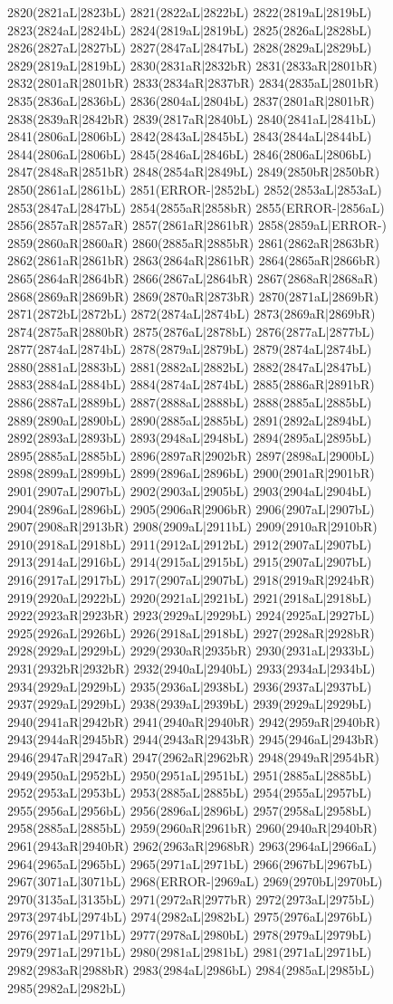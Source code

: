 2820(2821aL|2823bL) 2821(2822aL|2822bL) 2822(2819aL|2819bL) 2823(2824aL|2824bL) 2824(2819aL|2819bL) 2825(2826aL|2828bL) 2826(2827aL|2827bL) 2827(2847aL|2847bL) 2828(2829aL|2829bL) 2829(2819aL|2819bL) 2830(2831aR|2832bR) 2831(2833aR|2801bR) 2832(2801aR|2801bR) 2833(2834aR|2837bR) 2834(2835aL|2801bR) 2835(2836aL|2836bL) 2836(2804aL|2804bL) 2837(2801aR|2801bR) 2838(2839aR|2842bR) 2839(2817aR|2840bL) 2840(2841aL|2841bL) 2841(2806aL|2806bL) 2842(2843aL|2845bL) 2843(2844aL|2844bL) 2844(2806aL|2806bL) 2845(2846aL|2846bL) 2846(2806aL|2806bL) 2847(2848aR|2851bR) 2848(2854aR|2849bL) 2849(2850bR|2850bR) 2850(2861aL|2861bL) 2851(ERROR-|2852bL) 2852(2853aL|2853aL) 2853(2847aL|2847bL) 2854(2855aR|2858bR) 2855(ERROR-|2856aL) 2856(2857aR|2857aR) 2857(2861aR|2861bR) 2858(2859aL|ERROR-) 2859(2860aR|2860aR) 2860(2885aR|2885bR) 2861(2862aR|2863bR) 2862(2861aR|2861bR) 2863(2864aR|2861bR) 2864(2865aR|2866bR) 2865(2864aR|2864bR) 2866(2867aL|2864bR) 2867(2868aR|2868aR) 2868(2869aR|2869bR) 2869(2870aR|2873bR) 2870(2871aL|2869bR) 2871(2872bL|2872bL) 2872(2874aL|2874bL) 2873(2869aR|2869bR) 2874(2875aR|2880bR) 2875(2876aL|2878bL) 2876(2877aL|2877bL) 2877(2874aL|2874bL) 2878(2879aL|2879bL) 2879(2874aL|2874bL) 2880(2881aL|2883bL) 2881(2882aL|2882bL) 2882(2847aL|2847bL) 2883(2884aL|2884bL) 2884(2874aL|2874bL) 2885(2886aR|2891bR) 2886(2887aL|2889bL) 2887(2888aL|2888bL) 2888(2885aL|2885bL) 2889(2890aL|2890bL) 2890(2885aL|2885bL) 2891(2892aL|2894bL) 2892(2893aL|2893bL) 2893(2948aL|2948bL) 2894(2895aL|2895bL) 2895(2885aL|2885bL) 2896(2897aR|2902bR) 2897(2898aL|2900bL) 2898(2899aL|2899bL) 2899(2896aL|2896bL) 2900(2901aR|2901bR) 2901(2907aL|2907bL) 2902(2903aL|2905bL) 2903(2904aL|2904bL) 2904(2896aL|2896bL) 2905(2906aR|2906bR) 2906(2907aL|2907bL) 2907(2908aR|2913bR) 2908(2909aL|2911bL) 2909(2910aR|2910bR) 2910(2918aL|2918bL) 2911(2912aL|2912bL) 2912(2907aL|2907bL) 2913(2914aL|2916bL) 2914(2915aL|2915bL) 2915(2907aL|2907bL) 2916(2917aL|2917bL) 2917(2907aL|2907bL) 2918(2919aR|2924bR) 2919(2920aL|2922bL) 2920(2921aL|2921bL) 2921(2918aL|2918bL) 2922(2923aR|2923bR) 2923(2929aL|2929bL) 2924(2925aL|2927bL) 2925(2926aL|2926bL) 2926(2918aL|2918bL) 2927(2928aR|2928bR) 2928(2929aL|2929bL) 2929(2930aR|2935bR) 2930(2931aL|2933bL) 2931(2932bR|2932bR) 2932(2940aL|2940bL) 2933(2934aL|2934bL) 2934(2929aL|2929bL) 2935(2936aL|2938bL) 2936(2937aL|2937bL) 2937(2929aL|2929bL) 2938(2939aL|2939bL) 2939(2929aL|2929bL) 2940(2941aR|2942bR) 2941(2940aR|2940bR) 2942(2959aR|2940bR) 2943(2944aR|2945bR) 2944(2943aR|2943bR) 2945(2946aL|2943bR) 2946(2947aR|2947aR) 2947(2962aR|2962bR) 2948(2949aR|2954bR) 2949(2950aL|2952bL) 2950(2951aL|2951bL) 2951(2885aL|2885bL) 2952(2953aL|2953bL) 2953(2885aL|2885bL) 2954(2955aL|2957bL) 2955(2956aL|2956bL) 2956(2896aL|2896bL) 2957(2958aL|2958bL) 2958(2885aL|2885bL) 2959(2960aR|2961bR) 2960(2940aR|2940bR) 2961(2943aR|2940bR) 2962(2963aR|2968bR) 2963(2964aL|2966aL) 2964(2965aL|2965bL) 2965(2971aL|2971bL) 2966(2967bL|2967bL) 2967(3071aL|3071bL) 2968(ERROR-|2969aL) 2969(2970bL|2970bL) 2970(3135aL|3135bL) 2971(2972aR|2977bR) 2972(2973aL|2975bL) 2973(2974bL|2974bL) 2974(2982aL|2982bL) 2975(2976aL|2976bL) 2976(2971aL|2971bL) 2977(2978aL|2980bL) 2978(2979aL|2979bL) 2979(2971aL|2971bL) 2980(2981aL|2981bL) 2981(2971aL|2971bL) 2982(2983aR|2988bR) 2983(2984aL|2986bL) 2984(2985aL|2985bL) 2985(2982aL|2982bL) 
